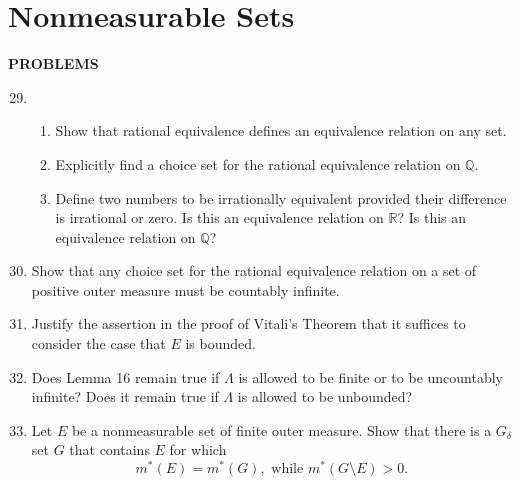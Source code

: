 \section{Nonmeasurable Sets}
\begin{center}
	\textbf{PROBLEMS}
\end{center}
\begin{enumerate}
	\setcounter{enumi}{28}
	\item 
	\begin{enumerate}[label=(\roman*),align=left]
		\item Show that rational equivalence defines an equivalence relation on any set.
		\item Explicitly find a choice set for the rational equivalence relation on $\mathbb{Q}$.
		\item Define two numbers to be irrationally equivalent provided their difference is irrational or zero. Is this an equivalence relation on $\mathbb{R}$? Is this an equivalence relation on $\mathbb{Q}$?
	\end{enumerate}
	\item Show that any choice set for the rational equivalence relation on a set of positive outer measure must be countably infinite.
	\item Justify the assertion in the proof of Vitali's Theorem that it suffices to consider the case that $E$ is bounded.
	\item Does Lemma 16 remain true if $\Lambda$ is allowed to be finite or to be uncountably infinite? Does it remain true if $\Lambda$ is allowed to be unbounded?
	\item Let $E$ be a nonmeasurable set of finite outer measure. Show that there is a $G_\delta$ set $G$ that contains $E$ for which
	\[
		m^*(E)=m^*(G),\text{ while }m^*(G\setminus E)>0.
	\]
\end{enumerate}

